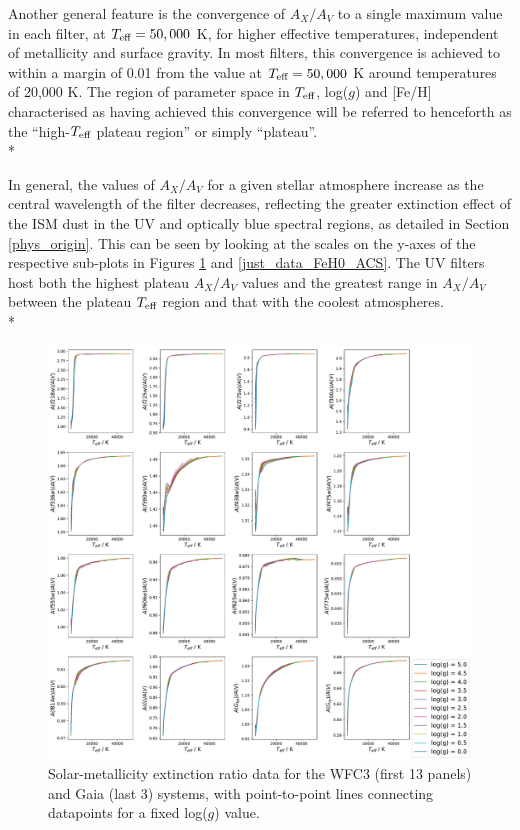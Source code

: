 \documentclass[12pt, a4paper]{report}
\begin{document}
Another general feature is the convergence of $A_{X}/A_{V}$ to a single maximum value in each filter, at $T_{\textnormal{eff}} = 50,000$ K, for higher effective temperatures, independent of metallicity and surface gravity. In most filters, this convergence is achieved to within a margin of 0.01 from the value at $T_{\textnormal{eff}} = 50,000$ K around temperatures of 20,000 K. The region of parameter space in $T_{\textnormal{eff}}$, log($g$) and [Fe/H] characterised as having achieved this convergence will be referred to henceforth as the ``high-$T_{\textnormal{eff}}$ plateau region'' or simply ``plateau''.\\*

In general, the values of $A_{X}/A_{V}$ for a given stellar atmosphere increase as the central wavelength of the filter decreases, reflecting the greater extinction effect of the ISM dust in the UV and optically blue spectral regions, as detailed in Section \ref{phys_origin}. This can be seen by looking at the scales on the y-axes of the respective sub-plots in Figures \ref{just_data_FeH0_WFC3gaia} and \ref{just_data_FeH0_ACS}. The UV filters host both the highest plateau $A_{X}/A_{V}$ values and the greatest range in $A_{X}/A_{V}$ between the plateau $T_{\textnormal{eff}}$ region and that with the coolest atmospheres. \\*

\begin{figure}[h!]
\begin{center}
\includegraphics[width=0.85\paperwidth]{../just_full_data/comb/AHub_FeH0p0_just_Teff_plot_lines.pdf}
\caption{Solar-metallicity extinction ratio data for the WFC3 (first 13 panels) and Gaia (last 3) systems, with point-to-point lines connecting datapoints for a fixed log($g$) value.}
\label{just_data_FeH0_WFC3gaia}
\end{center}
\end{figure}
\end{document}
